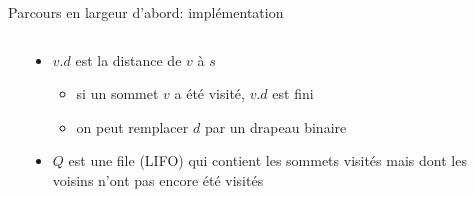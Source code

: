 \begin{frame}{Parcours en largeur d'abord: implémentation}

\begin{columns}
\begin{column}{6cm}
\begin{center}
{\small
{}
}
\end{center}
\end{column}
\begin{column}{6cm}
\begin{itemize}
\item $v.d$ est la distance de $v$ à $s$
\begin{itemize}
\item si un sommet $v$ a été visité, $v.d$ est fini
\item on peut remplacer $d$ par un drapeau binaire
\end{itemize}

\bigskip

\item $Q$ est une file (LIFO) qui contient les sommets visités mais
  dont les voisins n'ont pas encore été visités
\end{itemize}
\end{column}
\end{columns}

\end{frame}


